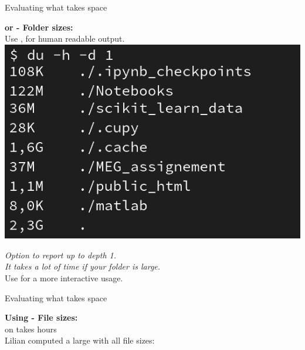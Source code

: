 \documentclass{beamer}
\begin{document}
    \begin{frame}{Evaluating what takes space}

        {\Large \bf {} or  - Folder sizes:}\\[1em]

        \myitem{} Use , for human readable output.\\[.5em]

        {\centering \includegraphics[width=.4\textwidth]{du.png}\\[1em]}

        \emph{Option  to report up to depth 1.\\
              It takes a lot of time if your  folder is large.}\\[1em]

        \myitem{} Use   for a more interactive usage.


    \end{frame}

    \begin{frame}{Evaluating what takes space}

        {\Large \bf Using  - File sizes:}\\[1em]

        \myitem{}  on  takes hours\\[.5em]
        \myitem{} Lilian computed a large  with all file sizes:\\[.5em]


        \quad\quad{}


    \end{frame}
\end{document}
